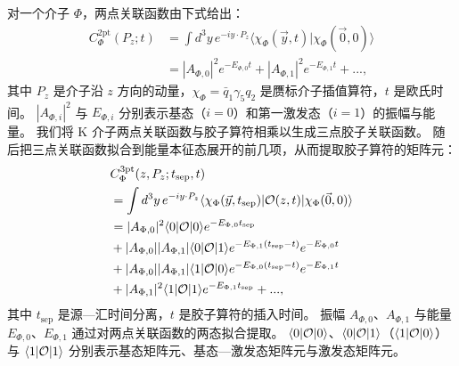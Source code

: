 对一个介子 $\Phi$，两点关联函数由下式给出：
%
\begin{align}
C_\Phi^\text{2pt}(P_z;t)&=
 \int d^3y\, e^{-i y\cdot P_z} \langle \chi_\Phi(\vec{y},t)|\chi_\Phi(\vec{0},0)\rangle \nonumber \\
  &= |A_{\Phi,0}|^2 e^{-E_{\Phi,0}t} + |A_{\Phi,1}|^2 e^{-E_{\Phi,1}t} + ...,
\label{eq:2pt_fit_formula}
\end{align}
%
其中 $P_z$ 是介子沿 $z$ 方向的动量，$\chi_\Phi=\bar{q}_1\gamma_5 q_2$ 是赝标介子插值算符，$t$ 是欧氏时间。
$|A_{\Phi,i}|^2$ 与 $E_{\Phi,i}$ 分别表示基态（$i=0$）和第一激发态（$i=1$）的振幅与能量。
我们将 K 介子两点关联函数与胶子算符相乘以生成三点胶子关联函数。
随后把三点关联函数拟合到能量本征态展开的前几项，从而提取胶子算符的矩阵元：
%
\begin{align}\label{eq:3ptC}
&C_\Phi^\text{3pt}(z,P_z;t_\text{sep},t) \nonumber \\
&=\int d^3y\, e^{-iy\cdot P_z}\langle \chi_\Phi(\vec y,t_\text{sep})|{\cal O}(z,t)|\chi_\Phi(\vec 0,0)\rangle \nonumber \\
&= |A_{\Phi,0}|^2\langle 0|{\cal O}|0\rangle e^{-E_{\Phi,0}t_\text{sep}} \nonumber \\
&+ |A_{\Phi,0}||A_{\Phi,1}|\langle 0|{\cal O}|1\rangle e^{-E_{\Phi,1}(t_\text{sep}-t)}e^{-E_{\Phi,0}t} \nonumber \\
&+ |A_{\Phi,0}||A_{\Phi,1}|\langle 1|{\cal O}|0\rangle e^{-E_{\Phi,0}(t_\text{sep}-t)}e^{-E_{\Phi,1}t} \nonumber \\
&+ |A_{\Phi,1}|^2\langle 1|{\cal O}|1\rangle e^{-E_{\Phi,1}t_\text{sep}}+ ...,
\end{align}
%
其中 $t_{\text{sep}}$ 是源—汇时间分离，$t$ 是胶子算符的插入时间。
振幅 $A_{\Phi,0}$、$A_{\Phi,1}$ 与能量 $E_{\Phi,0}$、$E_{\Phi,1}$ 通过对两点关联函数的两态拟合提取。
$\langle 0|{\cal O}|0\rangle$、$\langle 0|{\cal O}|1\rangle$（$\langle 1|{\cal O}|0\rangle$）与 $\langle 1|{\cal O}|1\rangle$ 分别表示基态矩阵元、基态—激发态矩阵元与激发态矩阵元。





